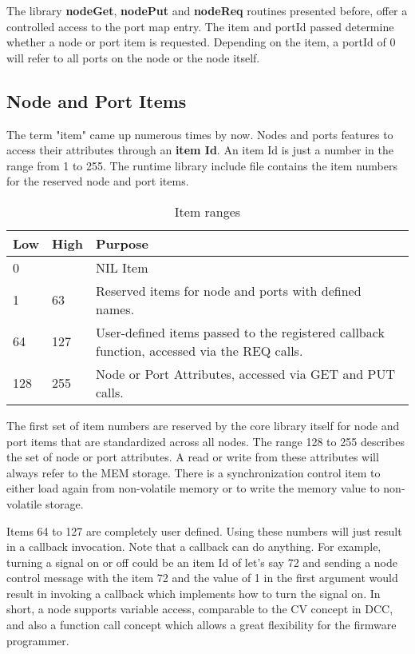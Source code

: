 The library \textbf{nodeGet}, \textbf{nodePut} and \textbf{nodeReq} routines presented before, offer a controlled access to the port map entry. The item and portId passed determine whether a node or port item is requested. Depending on the item, a portId of 0 will refer to all ports on the node or the node itself.

\subsection{Node and Port Items}

The term "item" came up numerous times by now. Nodes and ports features to access their attributes through an \textbf{item Id}. An item Id is just a number in the range from 1 to 255. The runtime library include file contains the item numbers for the reserved node and port items.

\begin{table}[!ht]
    \begin{center}
        
        \begin{tabularx}{0.9\textwidth}{|l|l|X|}
            \hline
            \textbf{Low} & \textbf{High} & \textbf{Purpose} \\
            \hline
            0 & & NIL Item \\
            \hline
            1 & 63 & Reserved items for node and ports with defined names. \\
            \hline
            64 & 127 & User-defined items passed to the registered callback function, accessed via the REQ calls. \\
            \hline
            128 & 255 & Node or Port Attributes, accessed via GET and PUT calls. \\
            \hline
        \end{tabularx}
    \end{center}
    \caption{Item ranges}
\end{table}
\FloatBarrier

The first set of item numbers are reserved by the core library itself for node and port items that are standardized across all nodes. The range 128 to 255 describes the set of node or port attributes. A read or write from these attributes will always refer to the MEM storage. There is a synchronization control item to either load again from non-volatile memory or to write the memory value to non-volatile storage.

Items 64 to 127 are completely user defined. Using these numbers will just result in a callback invocation. Note that a callback can do anything. For example, turning a signal on or off could be an item Id of let's say 72 and sending a node control message with the item 72 and the value of 1 in the first argument would result in invoking a callback which implements how to turn the signal on. In short, a node supports variable access, comparable to the CV concept in DCC, and also a function call concept which allows a great flexibility for the firmware programmer.


